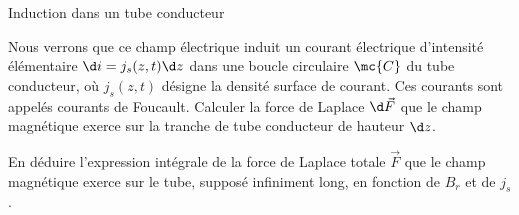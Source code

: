 \begin{exo}[PC][3][TD]{Induction dans un tube conducteur}
\begin{quest}
  \item Nous verrons que ce champ électrique induit un courant électrique d'intensité élémentaire $\d i = j_s(z,t) \d z$ dans une boucle circulaire $\mc{C}$ du tube conducteur, où $j_s(z,t)$ désigne la densité surface de courant. Ces courants sont appelés courants de Foucault.
   Calculer la force de Laplace $\d \Vec{F}$ que le champ magnétique exerce sur la tranche de tube conducteur de hauteur $\d z$.
  \item En déduire l'expression intégrale de la force de Laplace totale $\Vec{F}$ que le champ magnétique exerce sur le tube, supposé infiniment long, en fonction de $B_r$ et de $j_s$.
\end{quest}
\end{exo}

